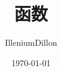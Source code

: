 \documentclass[a4paper, 12pt]{article}
\begin{document}
\title{函数}
\author{IlleniumDillon}
\date{\today}
\maketitle
\end{document}
